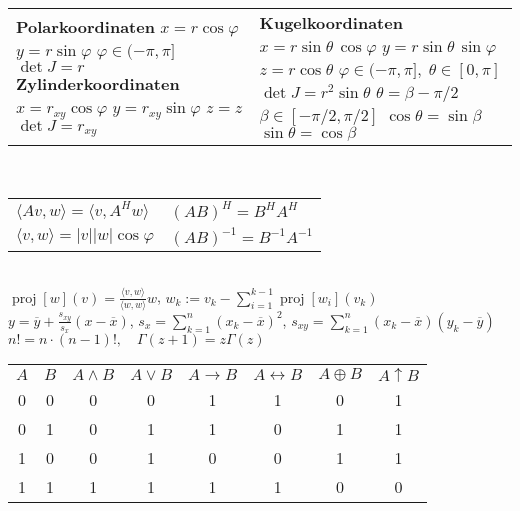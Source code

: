\documentclass[a4paper,10pt,fleqn,twoside,twocolumn]{scrartcl}
\newcommand{\strong}[1]{\textsf{\textbf{#1}}}
\newcommand{\ds}{\displaystyle}
\begin{document}
\begin{tabular}{@{}l|l}
\makecell[lt]{
\strong{Polarkoordinaten}\\
$x=r\cos\varphi$\\
$y=r\sin\varphi$\\
$\varphi\in(-\pi,\pi]$\\
$\det J=r$\\[4pt]
\strong{Zylinderkoordinaten}\\
$x=r_{xy}\cos\varphi$\\
$y=r_{xy}\sin\varphi$\\
$z=z$\\
$\det J=r_{xy}$
} & \makecell[lt]{
\strong{Kugelkoordinaten}\\
$x=r\sin\theta\,\cos\varphi$\\
$y=r\sin\theta\,\sin\varphi$\\
$z=r\cos\theta$\\
$\varphi\in(-\pi,\pi],\;\theta\in[0,\pi]$\\
$\det J=r^2\sin\theta$\\[4pt]
$\theta=\beta-\pi/2$\\
$\beta\in[-\pi/2,\pi/2]$\\
$\cos\theta=\sin\beta$\\
$\sin\theta=\cos\beta$
}
\end{tabular}\\[4pt]
\begin{tabular}{@{}l|l}
$\langle Av,w\rangle = \langle v,A^H w\rangle$
& $(AB)^H = B^H A^H$\\
$\langle v,w\rangle = |v||w|\cos\varphi$
& $(AB)^{-1} = B^{-1} A^{-1}$
\end{tabular}\\
$\operatorname{proj}[w](v) = \frac{\langle v,w\rangle}{\langle w,w\rangle} w$,\quad
$w_k := v_k - \sum_{i=1}^{k-1}\operatorname{proj}[w_i](v_k)$\\
$\ds y = \overline y + \frac{s_{xy}}{s_x}(x{-}\overline x)$,\;
$s_x = \sum\limits_{k=1}^n (x_k{-}\overline x)^2$,\;
$s_{xy} = \sum\limits_{k=1}^n (x_k{-}\overline x)(y_k{-}\overline y)$\\[4pt]
$n! = n\cdot (n-1)!,\quad \Gamma(z+1) = z\Gamma(z)$

\clearpage

\noindent
\begin{tabular}{@{}cccccccc@{}}
\toprule
$A$ & $B$ & $A\land B$ & $A\lor B$
& $A\rightarrow B$ & $A\leftrightarrow B$ & $A\oplus B$ & $A\uparrow B$\\
0 & 0 & 0 & 0 & 1 & 1 & 0 & 1\\
0 & 1 & 0 & 1 & 1 & 0 & 1 & 1\\
1 & 0 & 0 & 1 & 0 & 0 & 1 & 1\\
1 & 1 & 1 & 1 & 1 & 1 & 0 & 0
\end{tabular}
\end{document}
